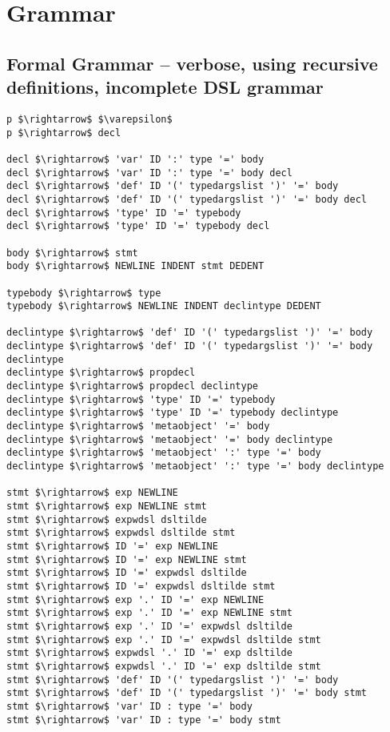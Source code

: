 \section{Grammar}
\label{s:grammar}

\subsection{Formal Grammar -- verbose, using recursive definitions, incomplete DSL grammar}

\begin{lstlisting}[mathescape]
p $\rightarrow$ $\varepsilon$
p $\rightarrow$ decl

decl $\rightarrow$ 'var' ID ':' type '=' body
decl $\rightarrow$ 'var' ID ':' type '=' body decl
decl $\rightarrow$ 'def' ID '(' typedargslist ')' '=' body
decl $\rightarrow$ 'def' ID '(' typedargslist ')' '=' body decl
decl $\rightarrow$ 'type' ID '=' typebody
decl $\rightarrow$ 'type' ID '=' typebody decl

body $\rightarrow$ stmt
body $\rightarrow$ NEWLINE INDENT stmt DEDENT

typebody $\rightarrow$ type
typebody $\rightarrow$ NEWLINE INDENT declintype DEDENT

declintype $\rightarrow$ 'def' ID '(' typedargslist ')' '=' body
declintype $\rightarrow$ 'def' ID '(' typedargslist ')' '=' body declintype
declintype $\rightarrow$ propdecl
declintype $\rightarrow$ propdecl declintype
declintype $\rightarrow$ 'type' ID '=' typebody
declintype $\rightarrow$ 'type' ID '=' typebody declintype
declintype $\rightarrow$ 'metaobject' '=' body
declintype $\rightarrow$ 'metaobject' '=' body declintype
declintype $\rightarrow$ 'metaobject' ':' type '=' body
declintype $\rightarrow$ 'metaobject' ':' type '=' body declintype

stmt $\rightarrow$ exp NEWLINE
stmt $\rightarrow$ exp NEWLINE stmt
stmt $\rightarrow$ expwdsl dsltilde
stmt $\rightarrow$ expwdsl dsltilde stmt
stmt $\rightarrow$ ID '=' exp NEWLINE
stmt $\rightarrow$ ID '=' exp NEWLINE stmt
stmt $\rightarrow$ ID '=' expwdsl dsltilde
stmt $\rightarrow$ ID '=' expwdsl dsltilde stmt
stmt $\rightarrow$ exp '.' ID '=' exp NEWLINE
stmt $\rightarrow$ exp '.' ID '=' exp NEWLINE stmt
stmt $\rightarrow$ exp '.' ID '=' expwdsl dsltilde
stmt $\rightarrow$ exp '.' ID '=' expwdsl dsltilde stmt
stmt $\rightarrow$ expwdsl '.' ID '=' exp dsltilde
stmt $\rightarrow$ expwdsl '.' ID '=' exp dsltilde stmt
stmt $\rightarrow$ 'def' ID '(' typedargslist ')' '=' body
stmt $\rightarrow$ 'def' ID '(' typedargslist ')' '=' body stmt
stmt $\rightarrow$ 'var' ID : type '=' body
stmt $\rightarrow$ 'var' ID : type '=' body stmt


\end{lstlisting}
